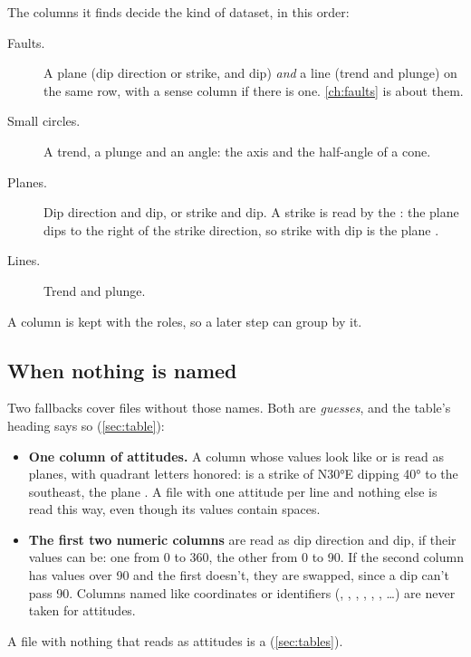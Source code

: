 The columns it finds decide the kind of dataset, in this order:

\begin{description}
\item[Faults.] A plane (dip direction or strike, and dip) \emph{and} a line (trend and plunge) on the
same row, with a sense column if there is one. \cref{ch:faults} is about them.
\item[Small circles.] A trend, a plunge and an angle: the axis and the half-angle of a cone.
\item[Planes.] Dip direction and dip, or strike and dip. A strike is read by the
: the plane dips to the right of the strike direction, so strike
 with dip  is the plane .
\item[Lines.] Trend and plunge.
\end{description}

A  column is kept with the roles, so a later step can group by it.

\subsection{When nothing is named}\label{sec:data-guess}

Two fallbacks cover files without those names. Both are \emph{guesses}, and the table's heading says so
(\cref{sec:table}):

\begin{itemize}
\item \textbf{One column of attitudes.} A column whose values look like  or
 is read as planes, with quadrant letters honored:  is a strike of
N30°E dipping 40° to the southeast, the plane . A file with one attitude per line and
nothing else is read this way, even though its values contain spaces.
\item \textbf{The first two numeric columns} are read as dip direction and dip, if their values can be:
one from 0 to 360, the other from 0 to 90. If the second column has values over 90 and the first doesn't,
they are swapped, since a dip can't pass 90. Columns named like coordinates or identifiers (,
, , , , , …) are never taken for attitudes.
\end{itemize}

A file with nothing that reads as attitudes is a  (\cref{sec:tables}).

